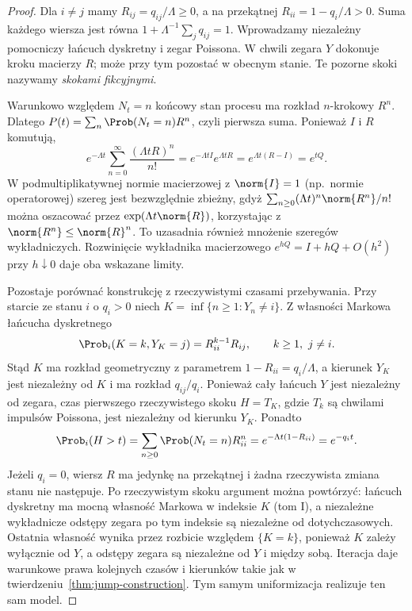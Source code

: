 \begin{proof}
Dla $i\ne j$ mamy $R_{ij}=q_{ij}/\Lambda\ge0$,
a na przekątnej $R_{ii}=1-q_i/\Lambda>0$.
Suma każdego wiersza jest równa
$1+\Lambda^{-1}\sum_j q_{ij}=1$.
Wprowadzamy niezależny pomocniczy łańcuch dyskretny
i zegar Poissona.
W chwili zegara $Y$ dokonuje kroku macierzy $R$; może
przy tym pozostać w obecnym stanie. Te pozorne skoki
nazywamy \emph{skokami fikcyjnymi}.

Warunkowo względem $N_t=n$ końcowy stan procesu ma
rozkład $n$-krokowy $R^n$. Dlatego
$P(t)=\sum_n\Prob(N_t=n)R^n$, czyli pierwsza suma.
Ponieważ $I$ i $R$ komutują,
\[
e^{-\Lambda t}\sum_{n=0}^\infty\frac{(\Lambda tR)^n}{n!}
=e^{-\Lambda t I}e^{\Lambda tR}
=e^{\Lambda t(R-I)}=e^{tQ}.
\]
W podmultiplikatywnej normie macierzowej z $\norm{I}=1$
(np.\ normie operatorowej) szereg jest bezwzględnie zbieżny, gdyż
$\sum_{n\ge0}(\Lambda t)^n\norm{R^n}/n!$ można oszacować
przez $\exp(\Lambda t\norm{R})$, korzystając z
$\norm{R^n}\le\norm{R}^n$.
To uzasadnia również mnożenie szeregów wykładniczych.
Rozwinięcie wykładnika macierzowego
$e^{hQ}=I+hQ+O(h^2)$ przy $h\downarrow0$
daje oba wskazane limity.

Pozostaje porównać konstrukcję z rzeczywistymi
czasami przebywania. Przy starcie ze stanu $i$ o $q_i>0$
niech $K=\inf\{n\ge1:Y_n\ne i\}$.
Z własności Markowa łańcucha dyskretnego
\[
\Prob_i(K=k,Y_K=j)=R_{ii}^{k-1}R_{ij},
\qquad k\ge1,\ j\ne i.
\]
Stąd $K$ ma rozkład geometryczny z parametrem
$1-R_{ii}=q_i/\Lambda$, a kierunek $Y_K$ jest niezależny
od $K$ i ma rozkład $q_{ij}/q_i$.
Ponieważ cały łańcuch $Y$ jest niezależny od zegara,
czas pierwszego rzeczywistego skoku $H=T_K$, gdzie
$T_k$ są chwilami impulsów Poissona, jest niezależny
od kierunku $Y_K$. Ponadto
\[
\Prob_i(H>t)=\sum_{n\ge0}\Prob(N_t=n)R_{ii}^n
=e^{-\Lambda t(1-R_{ii})}=e^{-q_i t}.
\]
Jeżeli $q_i=0$, wiersz $R$ ma jedynkę na przekątnej
i żadna rzeczywista zmiana stanu nie następuje.
Po rzeczywistym skoku argument można powtórzyć:
łańcuch dyskretny ma mocną własność Markowa w indeksie
$K$ (tom I), a niezależne wykładnicze odstępy zegara
po tym indeksie są niezależne od dotychczasowych.
Ostatnia własność wynika przez rozbicie względem
$\{K=k\}$, ponieważ $K$ zależy wyłącznie od $Y$,
a odstępy zegara są niezależne od $Y$ i między sobą.
Iteracja daje warunkowe prawa kolejnych czasów i kierunków
takie jak w twierdzeniu~\ref{thm:jump-construction}.
Tym samym uniformizacja realizuje ten sam model.
\end{proof}


